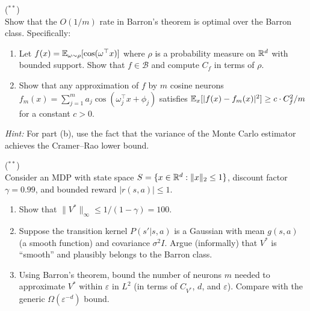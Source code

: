 \documentclass[11pt,a4paper]{article}
\begin{document}
\begin{exercise}
\textnormal{(\({}^{**}\))} \\
Show that the $O(1/m)$ rate in Barron's theorem is optimal over the Barron
class.  Specifically:
\begin{enumerate}[label=(\alph*)]
  \item Let $f(x) = \mathbb{E}_{\omega \sim \rho}[\cos(\omega^\top x)]$ where
    $\rho$ is a probability measure on $\mathbb{R}^d$ with bounded support.
    Show that $f \in \mathcal{B}$ and compute $C_f$ in terms of $\rho$.
  \item Show that any approximation of $f$ by $m$ cosine neurons
    $f_m(x) = \sum_{j=1}^m a_j \cos(\omega_j^\top x + \phi_j)$ satisfies
    $\mathbb{E}_x[|f(x) - f_m(x)|^2] \ge c \cdot C_f^2 / m$ for a constant
    $c > 0$.
\end{enumerate}
\textit{Hint:} For part (b), use the fact that the variance of the
Monte Carlo estimator achieves the Cramer--Rao lower bound.
\end{exercise}

\begin{exercise}
\textnormal{(\({}^{**}\))} \\
Consider an MDP with state space $S = \{x \in \mathbb{R}^d : \|x\|_2 \le 1\}$,
discount factor $\gamma = 0.99$, and bounded reward $|r(s,a)| \le 1$.
\begin{enumerate}[label=(\alph*)]
  \item Show that $\|V^*\|_\infty \le 1/(1-\gamma) = 100$.
  \item Suppose the transition kernel $P(s' | s, a)$ is a Gaussian with
    mean $g(s,a)$ (a smooth function) and covariance $\sigma^2 I$.
    Argue (informally) that $V^*$ is ``smooth'' and plausibly belongs
    to the Barron class.
  \item Using Barron's theorem, bound the number of neurons $m$ needed
    to approximate $V^*$ within $\varepsilon$ in $L^2$ (in terms of
    $C_{V^*}$, $d$, and $\varepsilon$).  Compare with the generic
    $\Omega(\varepsilon^{-d})$ bound.
\end{enumerate}
\end{exercise}
\end{document}
